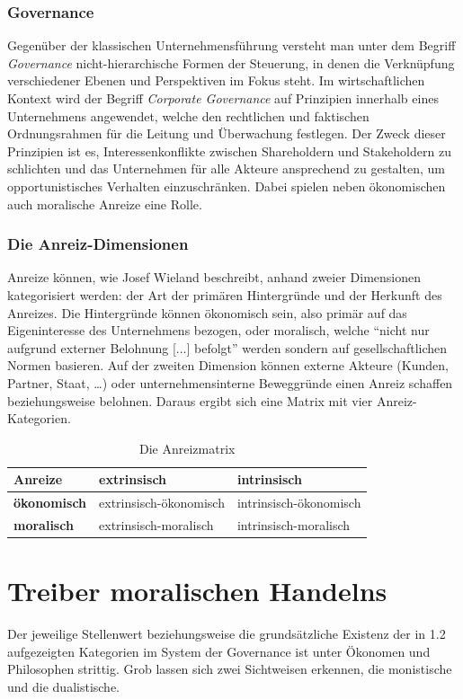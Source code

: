 \documentclass[12pt]{article}
\begin{document}
\section{Governance}
Gegenüber der klassischen Unternehmensführung versteht man unter dem Begriff \textit{Governance} nicht-hierarchische Formen der Steuerung, in denen die Verknüpfung verschiedener Ebenen und Perspektiven im Fokus steht. Im wirtschaftlichen Kontext wird der Begriff \textit{Corporate Governance} auf Prinzipien innerhalb eines Unternehmens angewendet, welche den rechtlichen und faktischen Ordnungsrahmen für die Leitung und Überwachung festlegen. Der Zweck dieser Prinzipien ist es, Interessenkonflikte zwischen Shareholdern und Stakeholdern zu schlichten und das Unternehmen für alle Akteure ansprechend zu gestalten, um opportunistisches Verhalten einzuschränken. Dabei spielen neben ökonomischen auch moralische Anreize eine Rolle.

\section{Die Anreiz-Dimensionen}
Anreize können, wie Josef Wieland beschreibt, anhand zweier Dimensionen kategorisiert werden: der Art der primären Hintergründe und der Herkunft des Anreizes. Die Hintergründe können ökonomisch sein, also primär auf das Eigeninteresse des Unternehmens bezogen, oder moralisch, welche “nicht nur aufgrund externer Belohnung [...] befolgt” werden sondern auf gesellschaftlichen Normen basieren. Auf der zweiten Dimension können externe Akteure (Kunden, Partner, Staat, …) oder unternehmensinterne Beweggründe einen Anreiz schaffen beziehungsweise belohnen. Daraus ergibt sich eine Matrix mit vier Anreiz-Kategorien.
\begin{table}[h]
\centering
\begin{tabular}{|p{3cm}|p{5cm}|p{5cm}|}
\hline
Anreize & \textbf{extrinsisch} & \textbf{intrinsisch}\\\hline
\textbf{ökonomisch} & extrinsisch-ökonomisch & intrinsisch-ökonomisch\\\hline
\textbf{moralisch} & extrinsisch-moralisch & intrinsisch-moralisch\\\hline
\end{tabular}
\caption{Die Anreizmatrix}
\end{table}

\part{Treiber moralischen Handelns}
Der jeweilige Stellenwert beziehungsweise die grundsätzliche Existenz der in 1.2 aufgezeigten Kategorien im System der Governance ist unter Ökonomen und Philosophen strittig. Grob lassen sich zwei Sichtweisen erkennen, die monistische und die dualistische.
\end{document}
